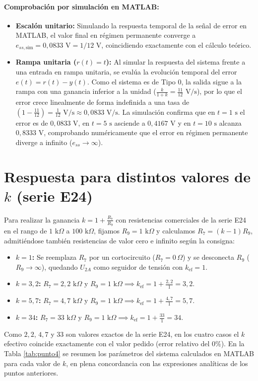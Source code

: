 \documentclass[11pt,a4paper]{article}
\begin{document}
\paragraph{Comprobación por simulación en MATLAB:}
\begin{itemize}
    \item \textbf{Escalón unitario:} Simulando la respuesta temporal de la señal de error en MATLAB, el valor final en régimen permanente converge a $e_{ss,\text{sim}} = 0,0833\text{ V} = 1/12\text{ V}$, coincidiendo exactamente con el cálculo teórico.
    \item \textbf{Rampa unitaria ($r(t) = t$):} Al simular la respuesta del sistema frente a una entrada en rampa unitaria, se evalúa la evolución temporal del error $e(t) = r(t) - y(t)$. Como el sistema es de Tipo 0, la salida sigue a la rampa con una ganancia inferior a la unidad ($\frac{k}{1+k} = \frac{11}{12}\text{ V/s}$), por lo que el error crece linealmente de forma indefinida a una tasa de $\left(1 - \frac{11}{12}\right) = \frac{1}{12}\text{ V/s} \approx 0,0833\text{ V/s}$. La simulación confirma que en $t = 1\text{ s}$ el error es de $0,0833\text{ V}$, en $t = 5\text{ s}$ asciende a $0,4167\text{ V}$ y en $t = 10\text{ s}$ alcanza $0,8333\text{ V}$, comprobando numéricamente que el error en régimen permanente diverge a infinito ($e_{ss} \to \infty$).
\end{itemize}

\section{Respuesta para distintos valores de $k$ (serie E24)}
Para realizar la ganancia $k = 1 + \frac{R_7}{R_9}$ con resistencias comerciales de la serie E24 en el rango de $1\text{ k}\Omega$ a $100\text{ k}\Omega$, fijamos $R_9 = 1\text{ k}\Omega$ y calculamos $R_7 = (k - 1)R_9$, admitiéndose también resistencias de valor cero e infinito según la consigna:
\begin{itemize}
    \item \textbf{$k = 1$:} Se reemplaza $R_7$ por un cortocircuito ($R_7 = 0\,\Omega$) y se desconecta $R_9$ ($R_9 \to \infty$), quedando $U_{2A}$ como seguidor de tensión con $k_{\text{ef}} = 1$.
    \item \textbf{$k = 3,2$:} $R_7 = 2,2\text{ k}\Omega$ y $R_9 = 1\text{ k}\Omega \implies k_{\text{ef}} = 1 + \frac{2,2}{1} = 3,2$.
    \item \textbf{$k = 5,7$:} $R_7 = 4,7\text{ k}\Omega$ y $R_9 = 1\text{ k}\Omega \implies k_{\text{ef}} = 1 + \frac{4,7}{1} = 5,7$.
    \item \textbf{$k = 34$:} $R_7 = 33\text{ k}\Omega$ y $R_9 = 1\text{ k}\Omega \implies k_{\text{ef}} = 1 + \frac{33}{1} = 34$.
\end{itemize}
Como $2,2$, $4,7$ y $33$ son valores exactos de la serie E24, en los cuatro casos el $k$ efectivo coincide exactamente con el valor pedido (error relativo del $0\%$). En la Tabla \ref{tab:punto4} se resumen los parámetros del sistema calculados en MATLAB para cada valor de $k$, en plena concordancia con las expresiones analíticas de los puntos anteriores.
\end{document}
